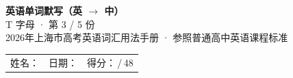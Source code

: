 \documentclass[10pt,a4paper]{article}
\begin{document}
\pagestyle{plain}

\begin{center}
{\LARGE\bfseries 英语单词默写（英 $\to$ 中）}\\[0.22em]
{\large T 字母 · 第 3 / 5 份}\\[0.18em]
{\small 2026年上海市高考英语词汇用法手册 · 参照普通高中英语课程标准}
\end{center}

\vspace{0.25em}
\noindent\begin{tabular}{@{}p{}@{}p{}@{}p{}@{}}
姓名：\underline{\hspace{2.0cm}} & 日期：\underline{\hspace{2.0cm}} & 得分：\underline{\hspace{1.3cm}}\,/\,48 \\
\end{tabular}

\vspace{0.3em}

\vspace{0.08em}
\end{document}
